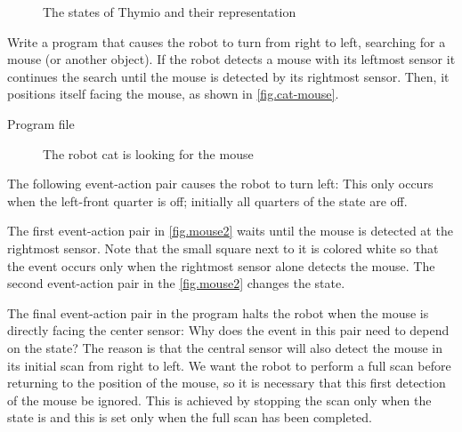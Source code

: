 
\begin{figure}
	\hfill
	\caption{The states of Thymio and their representation}
\end{figure}


Write a program that causes the robot to turn from right to left,
searching for a mouse (or another object).
If the robot detects a mouse with its leftmost sensor it
continues the search until the mouse is detected by its rightmost
sensor. Then, it positions itself facing the mouse, as shown in \cref{fig.cat-mouse}.

{\raggedleft \hfill Program file }

\begin{figure}
	\hfill
	\caption{The robot cat is looking for the mouse}
\end{figure}

The following event-action pair causes the robot to turn left: 
This only occurs when the left-front quarter is off; initially all
quarters of the state are off.

The first event-action pair in \cref{fig.mouse2} waits until the
mouse is detected at the rightmost sensor. Note that the small square
next to it is colored white so that the event occurs only when the
rightmost sensor alone detects the mouse. The second event-action pair
in the \cref{fig.mouse2} changes the state.

The final event-action pair in the program halts the robot when the mouse is directly facing the center
sensor: 
Why does the event in this pair need to depend on the state? The reason
is that the central sensor will also detect the mouse in its initial
scan from right to left. We want the robot to perform a full scan
before returning to the position of the mouse, so it is necessary that
this first detection of the mouse be ignored. This is achieved by
stopping the scan only when the state is  and this is set only
when the full scan has been completed.

